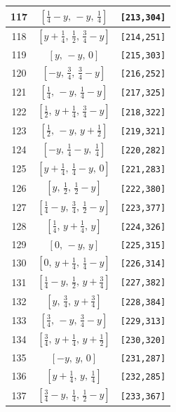 \documentclass[fleqn,8pt]{jsarticle}
\begin{document}
\begin{longtable}{ccc}
117 & $\left[ \frac{1}{4} - y,\, - y,\, \frac{1}{4} \right]$ & {\tt [213,304]} \\ \hline
118 & $\left[ y + \frac{1}{4},\, \frac{1}{2},\, \frac{3}{4} - y \right]$ & {\tt [214,251]} \\ \hline
119 & $\left[ y,\, - y,\, 0 \right]$ & {\tt [215,303]} \\ \hline
120 & $\left[ - y,\, \frac{3}{4},\, \frac{3}{4} - y \right]$ & {\tt [216,252]} \\ \hline
121 & $\left[ \frac{1}{4},\, - y,\, \frac{1}{4} - y \right]$ & {\tt [217,325]} \\ \hline
122 & $\left[ \frac{1}{2},\, y + \frac{1}{4},\, \frac{3}{4} - y \right]$ & {\tt [218,322]} \\ \hline
123 & $\left[ \frac{1}{2},\, - y,\, y + \frac{1}{2} \right]$ & {\tt [219,321]} \\ \hline
124 & $\left[ - y,\, \frac{1}{4} - y,\, \frac{1}{4} \right]$ & {\tt [220,282]} \\ \hline
125 & $\left[ y + \frac{1}{4},\, \frac{1}{4} - y,\, 0 \right]$ & {\tt [221,283]} \\ \hline
126 & $\left[ y,\, \frac{1}{2},\, \frac{1}{2} - y \right]$ & {\tt [222,380]} \\ \hline
127 & $\left[ \frac{1}{4} - y,\, \frac{3}{4},\, \frac{1}{2} - y \right]$ & {\tt [223,377]} \\ \hline
128 & $\left[ \frac{1}{4},\, y + \frac{1}{4},\, y \right]$ & {\tt [224,326]} \\ \hline
129 & $\left[ 0,\, - y,\, y \right]$ & {\tt [225,315]} \\ \hline
130 & $\left[ 0,\, y + \frac{1}{4},\, \frac{1}{4} - y \right]$ & {\tt [226,314]} \\ \hline
131 & $\left[ \frac{1}{4} - y,\, \frac{1}{2},\, y + \frac{3}{4} \right]$ & {\tt [227,382]} \\ \hline
132 & $\left[ y,\, \frac{3}{4},\, y + \frac{3}{4} \right]$ & {\tt [228,384]} \\ \hline
133 & $\left[ \frac{3}{4},\, - y,\, \frac{3}{4} - y \right]$ & {\tt [229,313]} \\ \hline
134 & $\left[ \frac{3}{4},\, y + \frac{1}{4},\, y + \frac{1}{2} \right]$ & {\tt [230,320]} \\ \hline
135 & $\left[ - y,\, y,\, 0 \right]$ & {\tt [231,287]} \\ \hline
136 & $\left[ y + \frac{1}{4},\, y,\, \frac{1}{4} \right]$ & {\tt [232,285]} \\ \hline
137 & $\left[ \frac{3}{4} - y,\, \frac{1}{4},\, \frac{1}{2} - y \right]$ & {\tt [233,367]} \\ \hline

\end{longtable}
\end{document}
